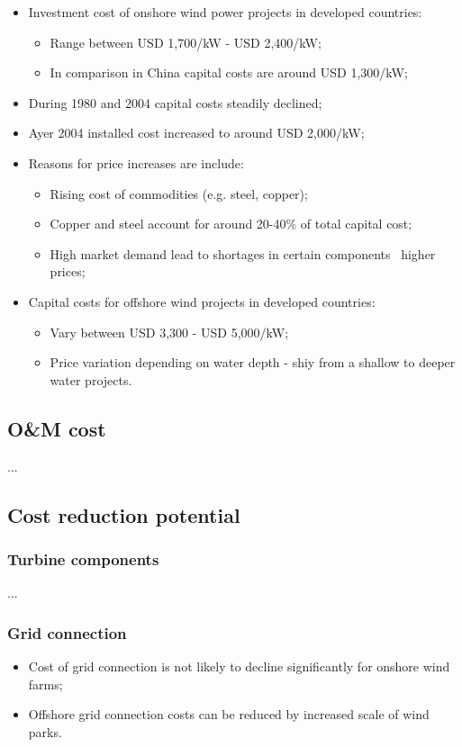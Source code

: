 \documentclass{article}
\newcommand{\tra}{\textrightarrow\ }
\begin{document}
\begin{itemize}
    \item Investment cost of onshore wind power projects in developed countries:
    \begin{itemize}[label=$\circ$]
        \item Range between USD 1,700/kW - USD 2,400/kW;
        \item In comparison in China capital costs are around USD 1,300/kW;
    \end{itemize}
    \item During 1980 and 2004 capital costs steadily declined;
    \item Ayer 2004 installed cost increased to around USD 2,000/kW;
    \item Reasons for price increases are include:
    \begin{itemize}[label=$\circ$]
        \item Rising cost of commodities (e.g. steel, copper);
        \item Copper and steel account for around 20-40\% of total capital cost;
        \item High market demand lead to shortages in certain components \tra higher prices;
    \end{itemize}
    \item Capital costs for offshore wind projects in developed countries:
    \begin{itemize}[label=$\circ$]
        \item Vary between USD 3,300 - USD 5,000/kW;
        \item Price variation depending on water depth - shiy from a shallow to deeper water projects.
    \end{itemize}
\end{itemize}

\subsection{O\&M cost}
...

\subsection{Cost reduction potential}
\subsubsection{Turbine components}
...

\subsubsection{Grid connection}
\begin{itemize}
    \item Cost of grid connection is not likely to decline significantly for onshore wind farms;
    \item Offshore grid connection costs can be reduced by increased scale of wind parks.
\end{itemize}
\end{document}
